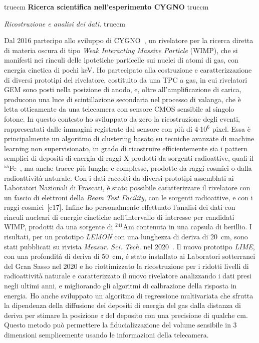 \documentclass[11pt,twoside,a4paper]{article}
\begin{document}
 truecm
{\bf{Ricerca scientifica nell'esperimento CYGNO}}
 truecm

\textit{Ricostruzione e analisi dei dati.}
 truecm

Dal 2016 partecipo allo sviluppo di CYGNO~\cite{Pinci:2019ztr}, un
rivelatore per la ricerca diretta di materia oscura di tipo
\textit{Weak Interacting Massive Particle} (WIMP), che si manifesti
nei rinculi delle ipotetiche particelle sui nuclei di atomi di gas,
con energia cinetica di pochi keV. Ho partecipato alla costruzione e
caratterizzazione di diversi prototipi del rivelatore, costituito da
una TPC a gas, in cui rivelatori GEM sono posti nella posizione di
anodo, e, oltre all'amplificazione di carica, producono una luce di
scintillazione secondaria nel processo di valanga, che \`e letta
otticamente da una telecamera con sensore CMOS sensibile al singolo
fotone.  In questo contesto ho sviluppato da zero la ricostruzione
degli eventi, rappresentati dalle immagini registrate dal sensore con
pi\`u di 4$\cdot$10$^6$ pixel.  Essa \`e principalmente un algoritmo
di clustering basato su tecniche avanzate di machine learning non
supervisionato, in grado di ricostruire efficientemente sia i pattern
semplici di depositi di energia di raggi X prodotti da sorgenti
radioattive, quali il $^{55}$Fe~\cite{Costa_2019}, ma anche tracce
pi\`u lunghe e complesse, prodotte da raggi cosmici o dalla
radioattivit\`a naturale.  Con i dati raccolti da diversi prototipi
assemblati ai Laboratori Nazionali di Frascati, \`e stato possibile
caratterizzare il rivelatore con un fascio di elettroni della
\textit{Beam Test Facility}, con le sorgenti radioattive, e con i
raggi cosmici~[c17]. Infine ho personalmente effettuato l'analisi dei
dati con rinculi nucleari di energie cinetiche nell'intervallo di
interesse per candidati WIMP, prodotti da una sorgente di $^{241}$Am
contenuta in una capsula di berillio. I risultati, per un prototipo
\textit{LEMON} con una lunghezza di deriva di \SI{20}{cm}, sono stati
pubblicati su rivista \textit{Measur. Sci. Tech.} nel
2020~\cite{Baracchini:2020nut}. Il nuovo prototipo \textit{LIME}, con
una profondit\`a di deriva di \SI{50}{cm}, \'e stato installato ai
Laboratori sotterranei del Gran Sasso nel 2020 e ho riottimizzato la
ricostruzione per i ridotti livelli di radioattivit\`a naturale e
caratterizzato il nuovo rivelatore analizzando i dati presi negli
ultimi anni, e migliorando gli algoritmi di calbrazione della risposta
in energia. Ho anche sviluppato un algoritmo di regressione
multivariata che sfrutta la dipendenza della diffusione dei depositi
di energia del gas dalla distanza di deriva per stimare la posizione
\textit{z} del deposito con una precisione di qualche cm. Questo
metodo pu\`o permettere la fiducializzazione del volume sensibile in 3
dimensioni semplicemente usando le informazioni della telecamera.
\end{document}
